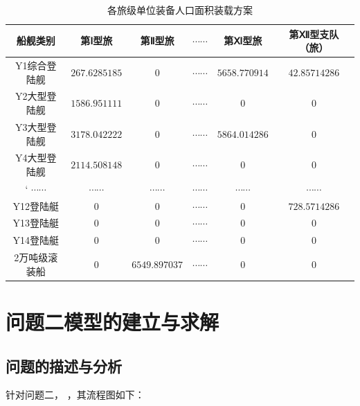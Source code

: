 \documentclass{whutmod}
\begin{document}
		\begin{table}[H]
		\centering		\caption{各旅级单位装备人口面积装载方案}\label{zhuangzai}
		\begin{tabular}{cccccc}
			\toprule[2pt]
			\multicolumn{1}{m{2cm}}{\centering 船舰类别}
			& \multicolumn{1}{m{2cm}}{\centering 第Ⅰ型旅}
			&\multicolumn{1}{m{2cm}}{\centering 第Ⅱ型旅}
			& \multicolumn{1}{m{3cm}}{\centering $ \cdots \cdots  $}
			& \multicolumn{1}{m{2cm}}{\centering 第Ⅺ型旅}
			& \multicolumn{1}{m{2cm}}{\centering 第Ⅻ型支队（旅）}
			\\
			\midrule[1pt]
			Y1综合登陆舰 &  $267.6285185$  &$0$ & $\cdots \cdots$&$5658.770914
			$ &$42.85714286$ \\ 
			Y2大型登陆舰	 &  $1586.951111$&$0$& $\cdots \cdots$ &$0$ &$0$\\ 
			Y3大型登陆舰	 &  $3178.042222 $ &$0$& $\cdots \cdots$ &$5864.014286
			$ &$0$\\ 
			Y4大型登陆舰	 &  $2114.508148 $ &$0$& $\cdots \cdots$ &$0
			$ &$0$\\ `
			$\cdots \cdots$	 &  $\cdots \cdots$  &$\cdots \cdots$ &$\cdots \cdots$ &$\cdots \cdots$ &$\cdots \cdots$\\ 
			Y12登陆艇	 &  $0$ &$0$ & $\cdots \cdots$ &$0$ &$728.5714286$\\ 
			Y13登陆艇	 &  $0$ &$0$ & $\cdots \cdots$ &$0$ &$0$\\ 
			Y14登陆艇		 &  $0$ &$0$ & $\cdots \cdots$ &$0$ &$0$\\ 
			2万吨级滚装船  &  $0 $ &$6549.897037$& $\cdots \cdots$ &$0$ &$0$ \\ 
			\bottomrule[2pt]	
		\end{tabular}
	\end{table}

	

	
	\section{问题二模型的建立与求解}
	\subsection{问题的描述与分析}
	针对问题二，
	，其流程图如下：
		
\end{document}
